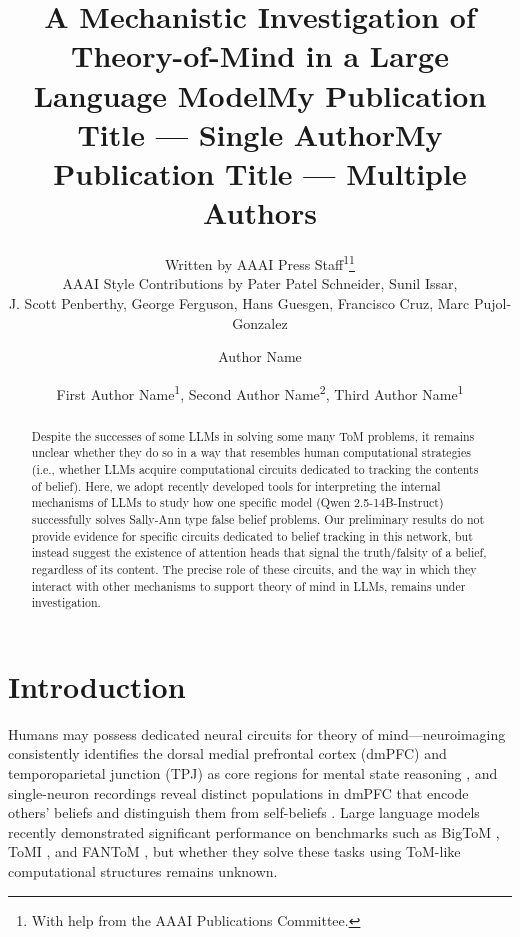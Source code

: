 \documentclass[letterpaper]{article} %
\title{A Mechanistic Investigation of Theory-of-Mind in a Large Language Model}
\author{
    Written by AAAI Press Staff\textsuperscript{\rm 1}\thanks{With help from the AAAI Publications Committee.}\\
    AAAI Style Contributions by Pater Patel Schneider,
    Sunil Issar,\\
    J. Scott Penberthy,
    George Ferguson,
    Hans Guesgen,
    Francisco Cruz\equalcontrib,
    Marc Pujol-Gonzalez\equalcontrib
}
\title{My Publication Title --- Single Author}
\author {
    Author Name
}
\title{My Publication Title --- Multiple Authors}
\author {
    First Author Name\textsuperscript{\rm 1},
    Second Author Name\textsuperscript{\rm 2},
    Third Author Name\textsuperscript{\rm 1}
}
\begin{document}
\maketitle

\begin{abstract}
 Despite the successes of some LLMs in solving some many ToM problems, it remains unclear whether they do so in a way that resembles human computational strategies (i.e., whether LLMs acquire computational circuits dedicated to tracking the contents of belief). Here, we adopt recently developed tools for interpreting the internal mechanisms of LLMs to study how one specific model (Qwen 2.5-14B-Instruct) successfully solves Sally-Ann type false belief problems. Our preliminary results do not provide evidence for specific circuits dedicated to belief tracking in this network, but instead suggest the existence of attention heads that signal the truth/falsity of a belief, regardless of its content. The precise role of these circuits, and the way in which they interact with other mechanisms to support theory of mind in LLMs, remains under investigation.
\end{abstract}

\section{Introduction}
Humans may possess dedicated neural circuits for theory of mind—neuroimaging consistently identifies the dorsal medial prefrontal cortex (dmPFC) and temporoparietal junction (TPJ) as core regions for mental state reasoning \citep{frith_neural_2006}, and single-neuron recordings reveal distinct populations in dmPFC that encode others' beliefs and distinguish them from self-beliefs \citep{jamaliSingleneuronalPredictionsOthers2021}. Large language models recently demonstrated significant performance on benchmarks such as BigToM \citep{shapiraCleverHansNeural2023}, ToMI \citep{le_revisiting_2019}, and FANToM \citep{kimFANToMBenchmarkStresstesting2023}, but whether they solve these tasks using ToM-like computational structures remains unknown.
\end{document}
